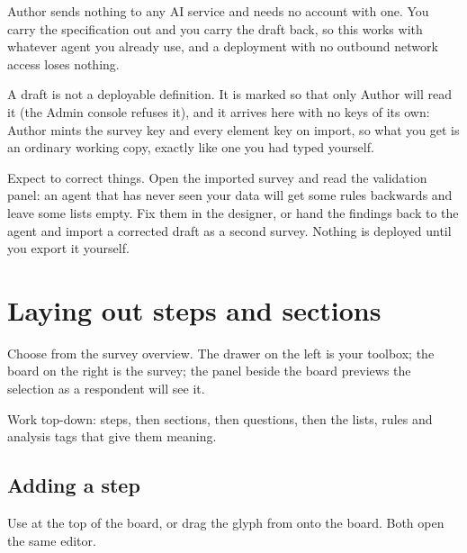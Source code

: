 \documentclass[11pt, a4paper]{article}
\begin{document}

\begin{elicitnote}
Author sends nothing to any AI service and needs no account with one. You carry the
specification out and you carry the draft back, so this works with whatever agent you already
use, and a deployment with no outbound network access loses nothing.
\end{elicitnote}

A draft is not a deployable definition. It is marked so that only Author will read it (the
Admin console refuses it), and it arrives here with no keys of its own: Author mints the
survey key and every element key on import, so what you get is an ordinary working copy, exactly
like one you had typed yourself.

Expect to correct things. Open the imported survey and read the validation panel: an agent that
has never seen your data will get some rules backwards and leave some lists empty. Fix them in
the designer, or hand the findings back to the agent and import a corrected draft as a second
survey. Nothing is deployed until you export it yourself.

\section{Laying out steps and sections}
\label{sec:layout}

Choose  from the survey overview. The drawer on the left is your toolbox; the board
on the right is the survey; the panel beside the board previews the selection as a respondent
will see it.


Work top-down: steps, then sections, then questions, then the lists, rules and analysis tags
that give them meaning.

\subsection{Adding a step}

Use  at the top of the board, or drag the  glyph from  onto
the board. Both open the same editor.
\end{document}
